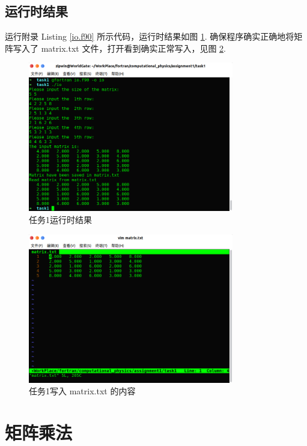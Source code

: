 \documentclass{article}
\begin{document}
	\subsection{运行时结果}
	运行附录 Listing \ref{io.f90} 所示代码，运行时结果如图 \ref{fig:rtr_io}. 确保程序确实正确地将矩阵写入了 matrix.txt 文件，打开看到确实正常写入，见图 \ref{fig:matrix}.
	\begin{figure}[h!tb]
		\centering
		\includegraphics[width=0.8\textwidth]{./utils/rtr_io.png}
		\caption{ 任务1运行时结果\label{fig:rtr_io}}
	\end{figure}
	\begin{figure}[h!tb]
		\centering
		\includegraphics[width=0.8\textwidth]{./utils/matrix.png}
		\caption{ 任务1写入 matrix.txt 的内容\label{fig:matrix}}
	\end{figure}

	\section{矩阵乘法}
\end{document}
